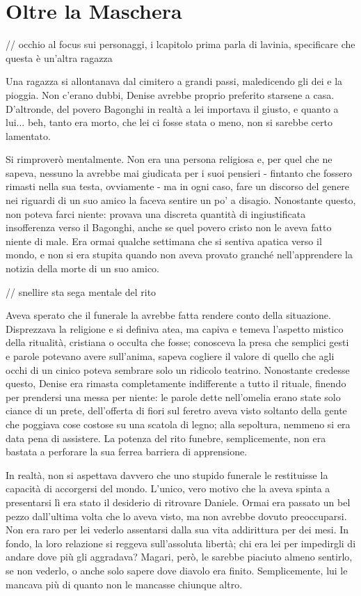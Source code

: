 \chapter{Oltre la Maschera}


// occhio al focus sui personaggi, i lcapitolo prima parla di lavinia, specificare che questa è un'altra ragazza

Una ragazza si allontanava dal cimitero a grandi passi, maledicendo gli dei e la pioggia. Non c'erano dubbi, Denise avrebbe proprio preferito starsene a casa. D'altronde, del povero Bagonghi in realtà a lei importava il giusto, e quanto a lui... beh, tanto era morto, che lei ci fosse stata o meno, non si sarebbe certo lamentato.

Si rimproverò mentalmente. Non era una persona religiosa e, per quel che ne sapeva, nessuno la avrebbe mai giudicata per i suoi pensieri - fintanto che fossero rimasti nella sua testa, ovviamente - ma in ogni caso, fare un discorso del genere nei riguardi di un suo amico la faceva sentire un po' a disagio. Nonostante questo, non poteva farci niente: provava una discreta quantità di ingiustificata insofferenza verso il Bagonghi, anche se quel povero cristo non le aveva fatto niente di male. Era ormai qualche settimana che si sentiva apatica verso il mondo, e non si era stupita quando non aveva provato granché nell'apprendere la notizia della morte di un suo amico.

// snellire sta sega mentale del rito

Aveva sperato che il funerale la avrebbe fatta rendere conto della situazione. Disprezzava la religione e si definiva atea, ma capiva e temeva l'aspetto mistico della ritualità, cristiana o occulta che fosse; conosceva la presa che semplici gesti e parole potevano avere sull'anima, sapeva cogliere il valore di quello che agli occhi di un cinico poteva sembrare solo un ridicolo teatrino. Nonostante credesse questo, Denise era rimasta completamente indifferente a tutto il rituale, finendo per prendersi una messa per niente: le parole dette nell'omelia erano state solo ciance di un prete, dell'offerta di fiori sul feretro aveva visto soltanto della gente che poggiava cose costose su una scatola di legno; alla sepoltura, nemmeno si era data pena di assistere. La potenza del rito funebre, semplicemente, non era bastata a perforare la sua ferrea barriera di apprensione.

In realtà, non si aspettava davvero che uno stupido funerale le restituisse la capacità di accorgersi del mondo. L'unico, vero motivo che la aveva spinta a presentarsi lì era stato il desiderio di ritrovare Daniele. Ormai era passato un bel pezzo dall'ultima volta che lo aveva visto, ma non avrebbe dovuto preoccuparsi. Non era raro per lei vederlo assentarsi dalla sua vita addirittura per dei mesi. In fondo, la loro relazione si reggeva sull'assoluta libertà; chi era lei per impedirgli di andare dove più gli aggradava? Magari, però, le sarebbe piaciuto almeno sentirlo, se non vederlo, o anche solo sapere dove diavolo era finito. Semplicemente, lui le mancava più di quanto non le mancasse chiunque altro.

